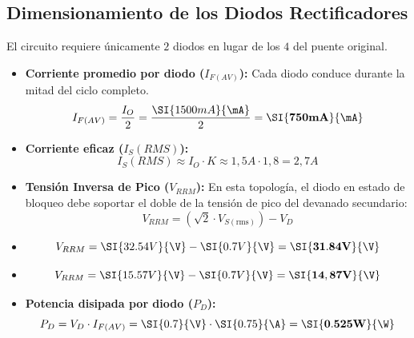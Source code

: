 \documentclass[12pt,a4paper]{article}
\begin{document}
\subsection{Dimensionamiento de los Diodos Rectificadores}
El circuito requiere únicamente $2$ diodos en lugar de los $4$ del puente original.
\begin{itemize}
    \item \textbf{Corriente promedio por diodo ($I_{F(AV)}$):} Cada diodo conduce durante la mitad del ciclo completo.
    \begin{equation}
        I_{F(AV)} = \frac{I_O}{2} = \frac{\SI{1500mA}{\mA}}{2} = \mathbf{\SI{750mA}{\mA}}
    \end{equation}
    \item \textbf{Corriente eficaz ($I_S(RMS)$):}
    \begin{equation}
        I_S(RMS) \approx I_O \cdot K \approx 1,5A \cdot 1,8 = 2,7 A
    \end{equation}
    \item \textbf{Tensión Inversa de Pico ($V_{RRM}$):} En esta topología, el diodo en estado de bloqueo debe soportar el doble de la tensión de pico del devanado secundario:
    \begin{equation}
        V_{RRM} = (\sqrt{2} \cdot V_{S(\text{rms})}) - V_D
    \end{equation}
    \item \begin{equation}
        V_{RRM} = \SI{32.54V}{\V} - \SI{0.7V}{\V} = \mathbf{\SI{31.84V}{\V}}
    \end{equation}
    \item \begin{equation}
        V_{RRM} = \SI{15.57V}{\V} - \SI{0.7V}{\V} = \mathbf{\SI{14,87V}{\V}}
    \end{equation}
    
    \item \textbf{Potencia disipada por diodo ($P_D$):}
    \begin{equation}
        P_D = V_D \cdot I_{F(AV)} = \SI{0.7}{\V} \cdot \SI{0.75}{\A} = \mathbf{\SI{0.525W}{\W}}
    \end{equation}
\end{itemize}

%
%
\end{document}
